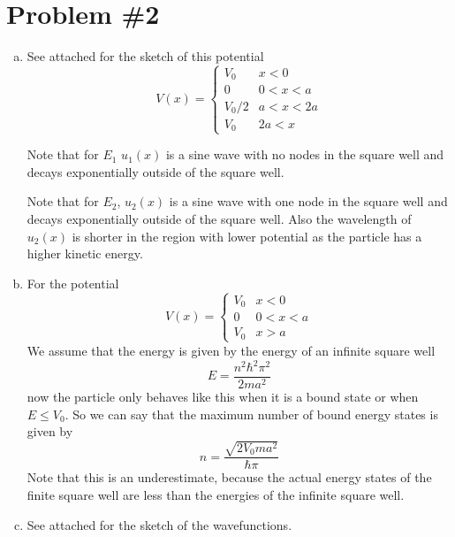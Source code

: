 \documentclass[11pt]{article}
\numberwithin{equation}{section}
\begin{document}
\section{Problem \#2}
\begin{enumerate}[(a)]
\item
See attached for the sketch of this potential 
$$V(x) = \left\{\begin{array}{ll}
	V_0	&x<0\\
	0	&0<x<a\\
	V_0/2	&a<x<2a\\
	V_0	&2a<x
		\end{array}\right.$$

Note that for $E_1$ $u_1(x)$ is a sine wave with no nodes in the square well and decays exponentially outside of the square well.

Note that for $E_2$, $u_2(x)$ is a sine wave with one node in the square well and decays exponentially outside of the square well. Also the wavelength of $u_2(x)$ is shorter in the region with lower potential as the particle has a higher kinetic energy.

\item
For the potential 
$$V(x) = \left\{\begin{array}{ll}
	V_0	&x<0\\
	0	&0<x<a\\
	V_0	&x>a
		\end{array}\right.$$
We assume that the energy is given by the energy of an infinite square well 
$$E = \frac{n^2\hbar^2\pi^2}{2ma^2}$$
now the particle only behaves like this when it is a bound state or when $E\le V_0$. So we can say that the maximum number of bound energy states is given by
$$n = \frac{\sqrt{2V_0ma^2}}{\hbar\pi}$$
Note that this is an underestimate, because the actual energy states of the finite square well are less than the energies of the infinite square well.

\item
See attached for the sketch of the wavefunctions.
\end{enumerate}
\end{document}
